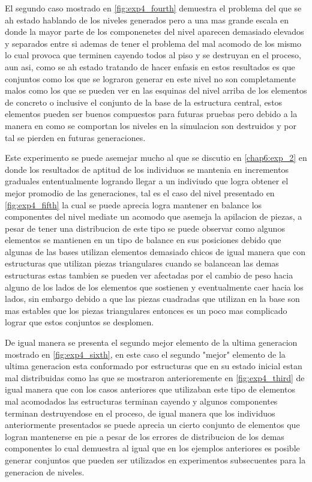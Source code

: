 El segundo caso mostrado en \ref{fig:exp4_fourth} demuestra el problema del que
se ah estado hablando de los niveles generados pero a una mas grande escala en
donde la mayor parte de los componenetes del nivel aparecen demasiado elevados y
separados entre si ademas de tener el problema del mal acomodo de los mismo lo
cual provoca que terminen cayendo todos al piso y se destruyan en el proceso,
aun asi, como se ah estado tratando de hacer enfasis en estos resultados es que
conjuntos como los que se lograron generar en este nivel no son completamente
malos como los que se pueden ver en las esquinas del nivel arriba de los
elementos de concreto o inclusive el conjunto de la base de la estructura
central, estos elementos pueden ser buenos compuestos para futuras pruebas pero
debido a la manera en como se comportan los niveles en la simulacion son
destruidos y por tal se pierden en futuras generaciones.

Este experimento se puede asemejar mucho al que se discutio en \ref{chap6:exp_2}
en donde los resultados de aptitud de los individuos se mantenia en incrementos
graduales ententualmente logrando llegar a un indiviudo que logra obtener el
mejor promodio de las generaciones, tal es el caso del nivel presentado en
\ref{fig:exp4_fifth} la cual se puede aprecia logra mantener en balance los
componentes del nivel mediate un acomodo que asemeja la apilacion de piezas, a
pesar de tener una distribucion de este tipo se puede observar como algunos
elementos se mantienen en un tipo de balance en sus posiciones debido que
algunas de las bases utilizan elementos demasiado chicos de igual manera que con
estructuras que utilizan piezas triangulares cuando se balancean las demas
estructuras estas tambien se pueden ver afectadas por el cambio de peso hacia
alguno de los lados de los elementos que sostienen y eventualmente caer hacia
los lados, sin embargo debido a que las piezas cuadradas que utilizan en la base
son mas estables que los piezas triangulares entonces es un poco mas complicado
lograr que estos conjuntos se desplomen.

De igual manera se presenta el segundo mejor elemento de la ultima generacion
mostrado en \ref{fig:exp4_sixth}, en este caso el segundo "mejor" elemento de la
ultima generacion esta conformado por estructuras que en su estado inicial estan
mal distribuidas como las que se mostraron anterioremente en
\ref{fig:exp4_third} de igual manera que con los casos anteriores que utilizaban
este tipo de elementos mal acomodados las estructuras terminan cayendo y algunos
componentes terminan destruyendose en el proceso, de igual manera que los
individuos anteriormente presentados se puede aprecia un cierto conjunto de
elementos que logran mantenerse en pie a pesar de los errores de distribucion de
los demas componentes lo cual demuestra al igual que en los ejemplos anteriores
es posible generar conjuntos que pueden ser utilizados en experimentos
subsecuentes para la generacion de niveles.


